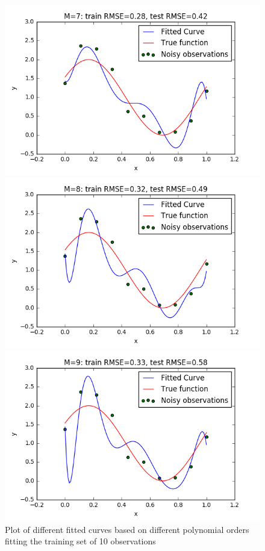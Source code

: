 \documentclass[a4paper]{article}
\begin{document}
\begin{figure}[h!]
\begin{multicols}{2}
    \includegraphics[width=\linewidth]{Images/curvefit_m7_n_10.png}\par
    \includegraphics[width=\linewidth]{Images/curvefit_m8_n_10.png}\par
    \includegraphics[width=\linewidth]{Images/curvefit_m9_n_10.png}\par
\end{multicols}
\label{fig:different-polynomials-rmse}
\caption{Plot of different fitted curves based on different polynomial orders fitting the training set of 10 observations}
\end{figure}
\end{document}
